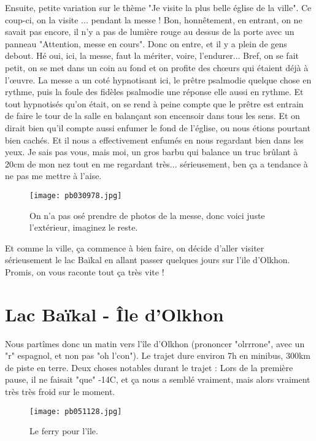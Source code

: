 \documentclass{book}
\begin{document}
Ensuite, petite variation sur le thème "Je visite la plus belle église de la ville". Ce coup-ci, on la visite ... pendant la messe ! Bon, honnêtement, en entrant, on ne savait pas encore, il n'y a pas de lumière rouge au dessus de la porte avec un panneau "Attention, messe en cours". Donc on entre, et il y a plein de gens debout. Hé oui, ici, la messe, faut la mériter, voire, l'endurer... Bref, on se fait petit, on se met dans un coin au fond et on profite des chœurs qui étaient déjà à l’œuvre. La messe a un coté hypnotisant ici, le prêtre psalmodie quelque chose en rythme, puis la foule des fidèles psalmodie une réponse elle aussi en rythme. Et tout hypnotisés qu'on était, on se rend à peine compte que le prêtre est entrain de faire le tour de la salle en balançant son encensoir dans tous les sens. Et on dirait bien qu'il compte aussi enfumer le fond de l'église, ou nous étions pourtant bien cachés. Et il nous a effectivement enfumés en nous regardant bien dans les yeux. Je sais pas vous, mais moi, un gros barbu qui balance un truc brûlant à 20cm de mon nez tout en me regardant très... sérieusement, ben ça a tendance à ne pas me mettre à l'aise.


\begin{figure}[h]
\centering
\texttt{[image: pb030978.jpg]}
\caption*{ On n'a pas osé prendre de photos de la messe, donc voici juste l'extérieur, imaginez le reste.}
\end{figure}

Et comme la ville, ça commence à bien faire, on décide d'aller visiter sérieusement le lac Baïkal en allant passer quelques jours sur l'ile d'Olkhon. Promis, on vous raconte tout ça très vite !



\chapter{Lac Baïkal - Île d'Olkhon}
Nous partîmes donc un matin vers l'île d'Olkhon (prononcer "olrrrone", avec un "r" espagnol, et non pas "oh l'con"). Le trajet dure environ 7h en minibus, 300km de piste en terre. Deux choses notables durant le trajet :
Lors de la première pause, il ne faisait "que" -14\textdegree C, et ça nous a semblé vraiment, mais alors vraiment très très froid sur le moment.


\begin{figure}[h]
\centering
\texttt{[image: pb051128.jpg]}
\caption*{ Le ferry pour l'île.}
\end{figure}
\end{document}
